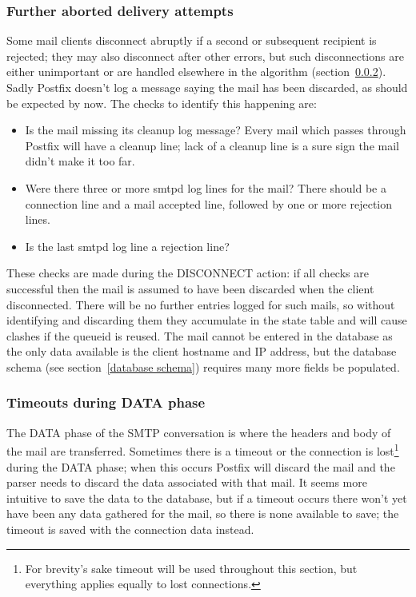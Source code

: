 \documentclass[a4paper,12pt,draft]{article}
\begin{document}
\subsubsection{Further aborted delivery attempts}

Some mail clients disconnect abruptly if a second or subsequent recipient
is rejected; they may also disconnect after other errors, but such
disconnections are either unimportant or are handled elsewhere in the
algorithm (section~\ref{timeouts-during-data-phase}).  Sadly Postfix
doesn't log a message saying the mail has been discarded, as should be
expected by now.  The checks to identify this happening are:

\begin{itemize}

    \item Is the mail missing its cleanup log message?  Every mail which
        passes through Postfix will have a cleanup line; lack of a cleanup
        line is a sure sign the mail didn't make it too far.

    \item Were there three or more smtpd log lines for the mail?  There
        should be a connection line and a mail accepted line, followed by
        one or more rejection lines.

    \item Is the last smtpd log line a rejection line?

\end{itemize}

These checks are made during the DISCONNECT action: if all checks are
successful then the mail is assumed to have been discarded when the client
disconnected.  There will be no further entries logged for such mails, so
without identifying and discarding them they accumulate in the state table
and will cause clashes if the queueid is reused.  The mail cannot be
entered in the database as the only data available is the client hostname
and IP address, but the database schema (see section~\ref{database schema})
requires many more fields be populated.

\subsubsection{Timeouts during DATA phase}

\label{timeouts-during-data-phase}

The DATA phase of the SMTP conversation is where the headers and body of the
mail are transferred.  Sometimes there is a timeout or the connection is
lost\footnote{For brevity's sake timeout will be used throughout this
section, but everything applies equally to lost connections.} during the
DATA phase; when this occurs Postfix will discard the mail and the parser
needs to discard the data associated with that mail.  It seems more
intuitive to save the data to the database, but if a timeout occurs there
won't yet have been any data gathered for the mail, so there is none
available to save; the timeout is saved with the connection data instead.
\end{document}
